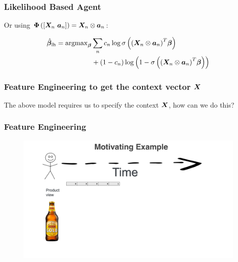 \begin{frame}
  \frametitle{Likelihood Based Agent}

Or using $\bm{\Phi} \left( \left[ {\bm{X}}_n ~ {\bm{a}}_n \right] \right) = {\bm{X}}_n \otimes {\bm{a}}_n$:

\begin{align*}
	\hat{\bm{\beta}}_{\rm lh} = {\rm argmax}_{\bm{\beta}}
	& \sum_n c_n \log \sigma
				\left(
					{
						\left(
							{\bm{X}}_n \otimes {\bm{a}}_n
						\right)
					}^T \bm{\beta}
				\right) \\
	& + \left(
		1-c_n
	  \right)
	  \log
	  \left(
	  	1 - \sigma
			\left(
				{
					\left(
						{\bm{X}}_n \otimes {\bm{a}}_n
					\right)
				}^T \bm{\beta}
			\right)
	\right)
  \end{align*}
\end{frame}


\begin{frame}
  \frametitle{Feature Engineering to get the context vector $\bm{X}$}

  The above model requires us to specify the context $\bm{X}$, how can we do this?
\end{frame}




\begin{frame}
  \frametitle{Feature Engineering}
 
 
   \begin{figure}[h!]
     \includegraphics[scale=0.25]{images/feat_eng1.png}
       \centering
       \label{motex1}
   \end{figure}
     
 \end{frame}



